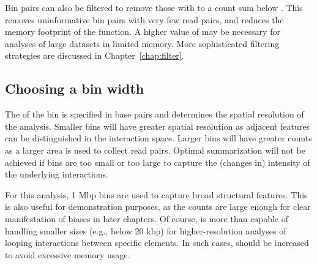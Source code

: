\documentclass{report}\usepackage[]{graphicx}\usepackage[usenames,dvipsnames]{color}
\newcommand{\hlopt}[1]{\textcolor[rgb]{0,0,0}{#1}}%
\newcommand{\hlstd}[1]{\textcolor[rgb]{0.251,0.251,0.251}{#1}}%
\newcommand{\hlkwd}[1]{\textcolor[rgb]{0.878,0.439,0.125}{#1}}%
\newenvironment{knitrout}{}{} %
\begin{document}
\begin{knitrout}
\color{fgcolor}
\end{knitrout}

Bin pairs can also be filtered to remove those with to a count sum below .
This removes uninformative bin pairs with very few read pairs, and reduces the memory footprint of the function.
A higher value of  may be necessary for analyses of large datasets in limited memory.
More sophisticated filtering strategies are discussed in Chapter~\ref{chap:filter}.

\subsection{Choosing a bin width}
The  of the bin is specified in base pairs and determines the spatial resolution of the analysis.
Smaller bins will have greater spatial resolution as adjacent features can be distinguished in the interaction space.
Larger bins will have greater counts as a larger area is used to collect read pairs.
Optimal summarization will not be achieved if bins are too small or too large to capture the (changes in) intensity of the underlying interactions.

For this analysis, 1 Mbp bins are used to capture broad structural features.
This is also useful for demonstration purposes, as the counts are large enough for clear manifestation of biases in later chapters.
Of course,  is more than capable of handling smaller sizes (e.g., below 20 kbp) for higher-resolution analyses of looping interactions between specific elements.
In such cases,  should be increased to avoid excessive memory usage.
\end{document}
